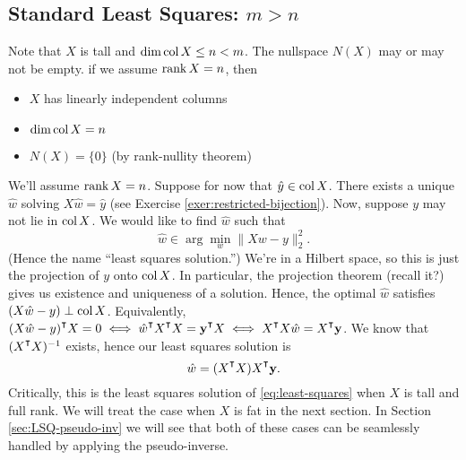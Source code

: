 \subsection{Standard Least Squares: $m>n$} \label{sec:least-squares1}
Note that $X$ is tall and $\dim \text{col}\, X \leq n < m$. The nullspace $N(X)$ may or may not be empty.  if we assume $\textup{rank}\, X = n$, then 
  \begin{itemize}
    \item $X$ has linearly independent columns
    \item $\dim \text{col}\, X = n$
    \item $N(X) = \{0\}$ (by rank-nullity theorem)
  \end{itemize}
We'll assume $\textup{rank}\, X = n$. Suppose for now that $\hat y\in \text{col}\, X$. There exists a unique $\hat w$ solving $X\hat w = \hat y$ (see Exercise \ref{exer:restricted-bijection}). 
Now, suppose $y$ may not lie in $\text{col}\, X$. We would like to find $\hat w$ such that 
\begin{equation} \label{eq:LSQ-opt-prob}
\hat w \in \arg\min_{w} \|Xw - y\|_2^2.
\end{equation}
(Hence the name ``least squares solution.'')
We're in a Hilbert space, so this is just the projection of $y$ onto $\text{col}\, X$. In particular, the projection theorem (recall it?) gives us existence and uniqueness of a solution. Hence, the optimal $\hat w$ satisfies $(X\hat w- y) \perp \text{col}\, X$. Equivalently, $(X\hat w - y)^\T X = 0 \iff \hat{w}^\T X^\T X = \y^\T X \iff X^\T X \hat w = X^\T \y$. We know that $(X^\T X)^{-1}$ exists, hence our least squares solution is
\begin{equation} \label{eq:LS-soln1}
\hat w = (X^\T X)X^\T\y.
\end{equation} 
Critically, this is the least squares solution of \eqref{eq:least-squares} when $X$ is tall and full rank. We will treat the case when $X$ is fat in the next section. In Section  \ref{sec:LSQ-pseudo-inv} we will see that both of these cases can be seamlessly handled by applying the pseudo-inverse. 





